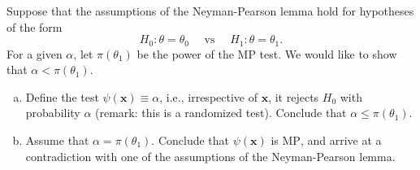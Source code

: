 \begin{ex}
    Suppose that the assumptions of the Neyman-Pearson lemma hold for hypotheses of the form
    \[
        H_{0}: \theta=\theta_{0} \quad \text { vs } \quad H_{1}: \theta=\theta_{1} .
    \]
    For a given \(\alpha\), let \(\pi\left(\theta_{1}\right)\) be the power of the MP test. We would like to show that \(\alpha<\pi\left(\theta_{1}\right)\). 
    \begin{enumerate}[(a)]
        \item Define the test \(\psi(\mathbf{x}) \equiv \alpha\), i.e., irrespective of \(\mathbf{x}\), it rejects \(H_{0}\) with probability \(\alpha\) (remark: this is a randomized test). Conclude that \(\alpha \leq \pi\left(\theta_{1}\right)\). 
        \item Assume that \(\alpha=\pi\left(\theta_{1}\right)\). Conclude that \(\psi(\mathbf{x})\) is \(\mathrm{MP}\), and arrive at a contradiction with one of the assumptions of the Neyman-Pearson lemma. 
    \end{enumerate}
\end{ex}

